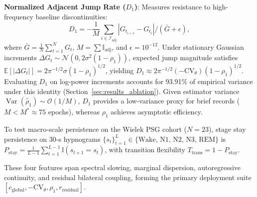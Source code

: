 \documentclass[journal,twoside,web]{ieeecolor}
\begin{document}
\textbf{Normalized Adjacent Jump Rate ($D_1$)}: Measures resistance to high-frequency baseline discontinuities:
\begin{equation}
D_1 = - \frac{1}{M}\sum_{i \in \mathcal{I}_{\text{adj}}} |G_{t_{i+1}} - G_{t_i}| / (\bar{G} + \epsilon),
\end{equation}
where $\bar{G} = \frac{1}{N}\sum_{t=1}^N G_t$, $M = \sum \mathbb{I}_{\text{adj}}$, and $\epsilon = 10^{-12}$. Under stationary Gaussian increments $\Delta G_t \sim \mathcal{N}(0, 2\sigma^2(1 - \rho_1))$, expected jump magnitude satisfies $\mathbb{E}[|\Delta G_t|] = 2\pi^{-1/2} \sigma (1 - \rho_1)^{1/2}$, yielding $D_1 \approx 2\pi^{-1/2} (-\mathrm{CV}_\theta) (1 - \rho_1)^{1/2}$. Evaluating $D_1$ on log-power increments accounts for 93.91\% of empirical variance under this identity (Section~\ref{sec:results_ablation}). Given estimator variance $\operatorname{Var}(\hat{\rho}_1) \sim \mathcal{O}(1/M)$, $D_1$ provides a low-variance proxy for brief records ($M < M^* \approx 75$ epochs), whereas $\rho_1$ achieves asymptotic efficiency.

To test macro-scale persistence on the Wielek PSG cohort ($N=23$), stage stay persistence on 30-s hypnograms $\{s_t\}_{t=1}^L \in \{\text{Wake, N1, N2, N3, REM}\}$ is $P_{\text{stay}} = \frac{1}{L-1}\sum_{t=1}^{L-1} \mathbb{I}(s_{t+1} = s_t)$, with transition flexibility $T_{\text{trans}} = 1 - P_{\text{stay}}$.
 
These four features span spectral slowing, marginal dispersion, autoregressive continuity, and residual bilateral coupling, forming the primary deployment suite $[c_{\text{global}}, -\mathrm{CV}_\theta, \rho_1, r_{\text{residual}}]$.
\end{document}
